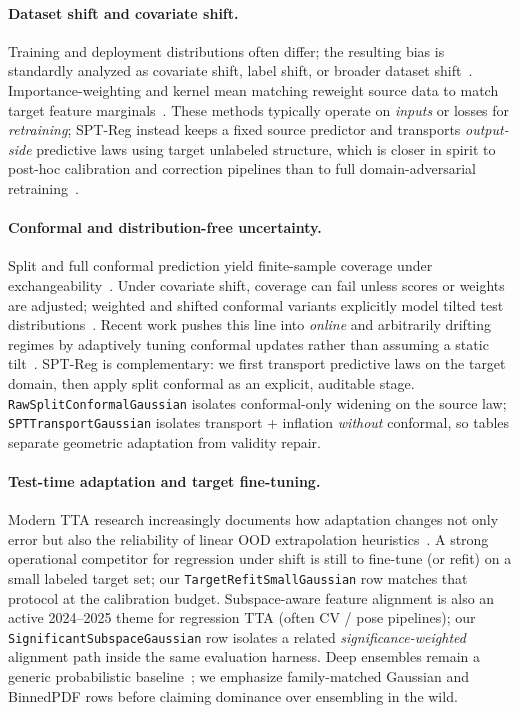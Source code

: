 \documentclass{article}
\begin{document}
\paragraph{Dataset shift and covariate shift.}
Training and deployment distributions often differ; the resulting bias is
standardly analyzed as covariate shift, label shift, or broader dataset
shift~\citep{quinonero2009dataset}. Importance-weighting and kernel mean
matching reweight source data to match target feature
marginals~\citep{huang2007correcting}. These methods typically operate on
\emph{inputs} or losses for \emph{retraining}; SPT-Reg instead keeps a fixed
source predictor and transports \emph{output-side} predictive laws using target
unlabeled structure, which is closer in spirit to post-hoc calibration and
correction pipelines than to full domain-adversarial
retraining~\citep{ganin2016domain}.

\paragraph{Conformal and distribution-free uncertainty.}
Split and full conformal prediction yield finite-sample coverage under
exchangeability~\citep{angelopoulos2021gentle}. Under covariate shift, coverage
can fail unless scores or weights are adjusted; weighted and shifted conformal
variants explicitly model tilted test
distributions~\citep{tibshirani2019conformal}. Recent work pushes this line into
\emph{online} and arbitrarily drifting regimes by adaptively tuning conformal
updates rather than assuming a static tilt~\citep{gibbs2024conformal}. SPT-Reg is
complementary: we first transport predictive laws on the target domain, then
apply split conformal as an explicit, auditable stage. \texttt{RawSplitConformalGaussian}
isolates conformal-only widening on the source law; \texttt{SPTTransportGaussian}
isolates transport + inflation \emph{without} conformal, so tables separate
geometric adaptation from validity repair.

\paragraph{Test-time adaptation and target fine-tuning.}
Modern TTA research increasingly documents how adaptation changes not only error
but also the reliability of linear OOD extrapolation
heuristics~\citep{kim2024test}. A strong operational competitor for regression
under shift is still to fine-tune (or refit) on a small labeled target set; our
\texttt{TargetRefitSmallGaussian} row matches that protocol at the calibration
budget. Subspace-aware feature alignment is also an active 2024--2025 theme for
regression TTA (often CV / pose pipelines); our
\texttt{SignificantSubspaceGaussian} row isolates a related \emph{significance-weighted}
alignment path inside the same evaluation harness. Deep ensembles remain a
generic probabilistic baseline~\citep{lakshminarayanan2017deep}; we emphasize
family-matched Gaussian and BinnedPDF rows before claiming dominance over
ensembling in the wild.
\end{document}
